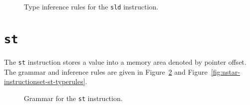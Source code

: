 \begin{figure}[H]
  \centering


  \caption{Type inference rules for the \texttt{sld} instruction.}
  \label{fig:nstar-instructionset-sld-typerules}
\end{figure}

\section{\texttt{st}}\label{sec:nstar-instructionset-st}

The \texttt{st} instruction stores a value into a memory area denoted by pointer offset.
The grammar and inference rules are given in Figure~\ref{fig:nstar-instructionset-st-grammar} and Figure~\ref{fig:nstar-instructionset-st-typerules}.

\begin{figure}[H]
  \centering


  \caption{Grammar for the \texttt{st} instruction.}
  \label{fig:nstar-instructionset-st-grammar}
\end{figure}

